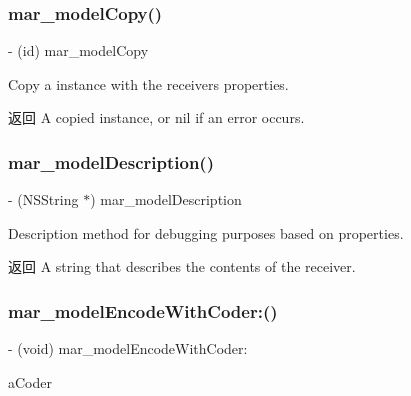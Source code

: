 \subsubsection{\texorpdfstring{mar\+\_\+model\+Copy()}{mar\_modelCopy()}}
{\footnotesize\ttfamily -\/ (id) mar\+\_\+model\+Copy \begin{DoxyParamCaption}{ }\end{DoxyParamCaption}}

Copy a instance with the receiver\textquotesingle{}s properties.

\begin{DoxyReturn}{返回}
A copied instance, or nil if an error occurs. 
\end{DoxyReturn}
\mbox{\label{category_n_s_object_07_m_a_r_model_08_a0cf32b800bc93bfcf4592b1115e4645e}} 
\subsubsection{\texorpdfstring{mar\+\_\+model\+Description()}{mar\_modelDescription()}}
{\footnotesize\ttfamily -\/ (N\+S\+String $\ast$) mar\+\_\+model\+Description \begin{DoxyParamCaption}{ }\end{DoxyParamCaption}}

Description method for debugging purposes based on properties.

\begin{DoxyReturn}{返回}
A string that describes the contents of the receiver. 
\end{DoxyReturn}
\mbox{\label{category_n_s_object_07_m_a_r_model_08_a76390b4dcb9c4a67c04cdad1de52a5a1}} 
\subsubsection{\texorpdfstring{mar\+\_\+model\+Encode\+With\+Coder\+:()}{mar\_modelEncodeWithCoder:()}}
{\footnotesize\ttfamily -\/ (void) mar\+\_\+model\+Encode\+With\+Coder\+: \begin{DoxyParamCaption}\item[{(N\+S\+Coder $\ast$)}]{a\+Coder }\end{DoxyParamCaption}}

